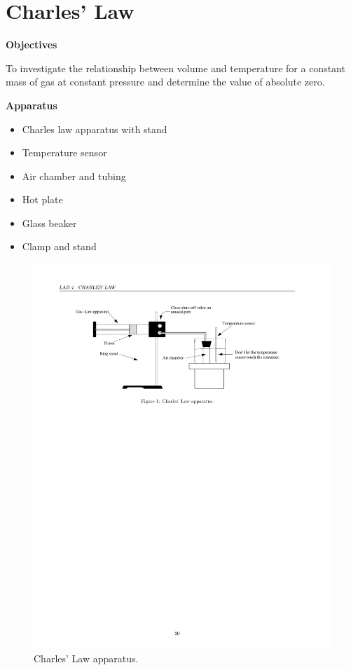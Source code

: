 
\section{Charles' Law}

\makelabheader %

\textbf{Objectives} 

To investigate the relationship between volume and temperature for
a constant mass of gas at constant pressure and determine the value
of absolute zero.

\textbf{Apparatus} 

\begin{itemize}
\item Charles law apparatus with stand
\item Temperature sensor
\item Air chamber and tubing
\item Hot plate
\item Glass beaker
\item Clamp and stand
\end{itemize}
\vspace{0.3cm}

\begin{figure}[hbt]
\begin{center}
\includegraphics[width=6.0in]{charles_law/charles_law_fig1.pdf}
\caption{Charles' Law apparatus.}
\end{center}
\end{figure}

